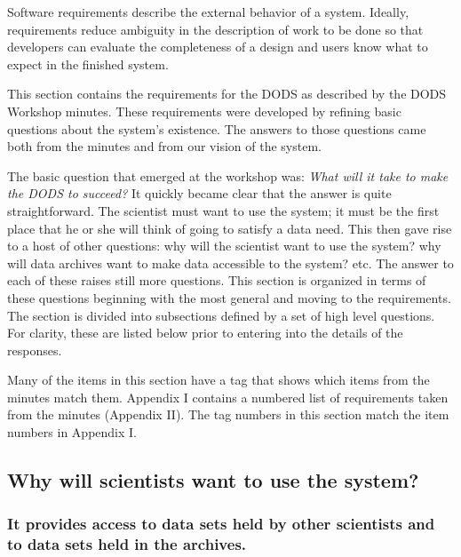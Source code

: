 Software requirements describe the external behavior of a system.  Ideally,
requirements reduce ambiguity in the description of work to be done so that
developers can evaluate the completeness of a design and users know what to
expect in the finished system.

This section contains the requirements for the DODS as described by the DODS
Workshop minutes.  These requirements were developed by refining basic
questions about the system's existence. The answers to 
those questions came both from the minutes and from our vision of the system.

The basic question that emerged at the workshop was: {\it What will it 
take to make the DODS to succeed?} It quickly became clear that the answer 
is quite straightforward. The scientist must want to use the system; 
it must be the first place that he or she will think of going to satisfy 
a data need. This then gave rise to a host of other questions: why 
will the scientist want to use the system? why will data archives want 
to make data accessible to the system? etc. The answer to each of 
these raises still more questions. This section is organized in terms 
of these questions beginning with the most general and moving to the 
requirements. The section is divided into subsections defined by a set 
of high level questions. For clarity, these are listed below prior to 
entering into the details of the responses.

Many of the items in this section have a tag that shows which items from the
minutes match them. Appendix I contains a numbered list of requirements taken
from the minutes (Appendix II). The tag numbers in this section match the 
item numbers in Appendix I. 

\subsection {Why will scientists want to use the system?}

\subsubsection {It provides access to data sets held by other scientists
and to data sets held in the archives.}

